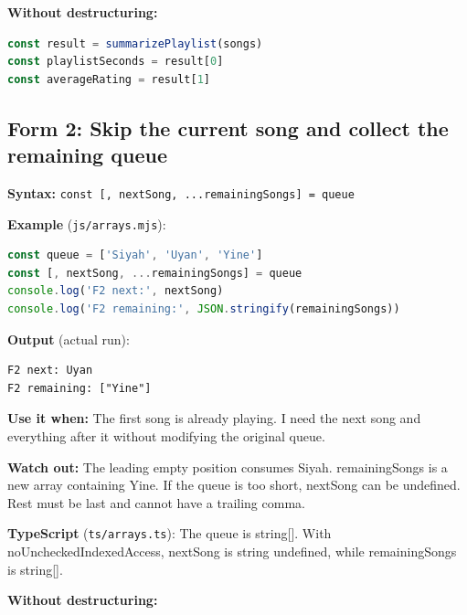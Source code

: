 \documentclass[
  10pt,
  a4paper,
  titlepage]{article}
\newcommand{\passthrough}[1]{#1}
\begin{document}

\textbf{Without destructuring:}

\Needspace{51.5pt}
\begin{lstlisting}[language=JavaScript]
const result = summarizePlaylist(songs)
const playlistSeconds = result[0]
const averageRating = result[1]
\end{lstlisting}

\subsection{Form 2: Skip the current song and collect the remaining
queue}\label{form-2-skip-the-current-song-and-collect-the-remaining-queue}

\textbf{Syntax:}
\passthrough{\lstinline!const [, nextSong, ...remainingSongs] = queue!}


\textbf{Example} (\passthrough{\lstinline!js/arrays.mjs!}):

\Needspace{61.8pt}
\begin{lstlisting}[language=JavaScript]
const queue = ['Siyah', 'Uyan', 'Yine']
const [, nextSong, ...remainingSongs] = queue
console.log('F2 next:', nextSong)
console.log('F2 remaining:', JSON.stringify(remainingSongs))
\end{lstlisting}


\textbf{Output} (actual run):

\Needspace{41.2pt}
\begin{lstlisting}
F2 next: Uyan
F2 remaining: ["Yine"]
\end{lstlisting}

\textbf{Use it when:} The first song is already playing. I need the next
song and everything after it without modifying the original queue.

\textbf{Watch out:} The leading empty position consumes Siyah.
remainingSongs is a new array containing Yine. If the queue is too
short, nextSong can be undefined. Rest must be last and cannot have a
trailing comma.

\textbf{TypeScript} (\passthrough{\lstinline!ts/arrays.ts!}): The queue
is string{[}{]}. With noUncheckedIndexedAccess, nextSong is string
\textbar{} undefined, while remainingSongs is string{[}{]}.


\textbf{Without destructuring:}
\end{document}
